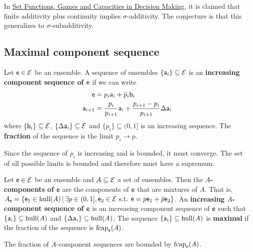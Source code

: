 \begin{remark}
	In \href{https://link.springer.com/book/10.1007/978-3-319-30690-2}{Set Functions, Games and Capacities in Decision Making}, it is claimed that finite additivity plus continuity implies $\sigma$-additivity. The conjecture is that this generalizes to $\sigma$-subadditivity.
\end{remark}


\subsection{Maximal component sequence}

\begin{defn}
	Let $\ens \in \Ens$ be an ensemble. A sequence of ensembles $\{\ens[a]_i\} \subseteq \Ens$ is an \textbf{increasing component sequence of $\ens$} if we can write
	\begin{align*}
		\ens &= p_i \ens[a]_i + \bar{p}_i \ens[b]_i  \\
		\ens[a]_{i+1} &= \frac{p_i}{p_{i+1}} \ens[a]_i + \frac{p_{i+1} - p_i}{p_{i+1}} \Delta \ens[a]_i
	\end{align*}
	where $\{\ens[b]_i\} \subseteq \Ens$, $\{\Delta\ens[a]_i\} \subseteq \Ens$ and $\{p_i\} \subseteq (0,1]$ is an increasing sequence. The \textbf{fraction} of the sequence is the limit $p_i \to p$.
\end{defn}

\begin{remark}
	Since the sequence of $p_i$ is increasing and is bounded, it must converge. The set of all possible limits is bounded and therefore must have a supremum.
\end{remark}

\begin{defn}
	Let $\ens \in \Ens$ be an ensemble and $A \subseteq \Ens$ a set of ensembles. Then the \textbf{$A$-components of $\ens$} are the components of $\ens$ that are mixtures of $A$. That is, $A_{\ens} = \{ \ens_1 \in \hull(A) \, | \, \exists p \in (0,1], \ens_2 \in \Ens \text{ s.t. } \ens = p \ens_1 + \bar{p} \ens_2  \}$. An \textbf{increasing $A$-component sequence of $\ens$} is an increasing component sequence of $\ens$ such that $\{\ens[a]_i\} \subseteq \hull(A)$ and $\{\Delta\ens[a]_i\} \subseteq \hull(A)$. The sequence $\{\ens[a]_i\} \subseteq \hull(A)$ is \textbf{maximal} if the fraction of the sequence is $\fcap_{\ens}(A)$.
\end{defn}

\begin{coro}
	The fraction of $A$-component sequences are bounded by $\fcap_{\ens}(A)$.
\end{coro}

